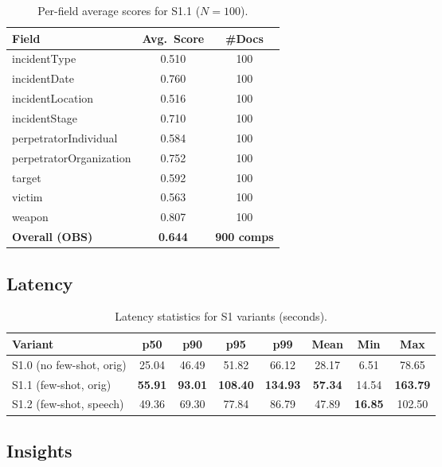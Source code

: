 \begin{table}[H]
    \centering
    \caption{Per-field average scores for S1.1 ($N{=}100$).}
    \label{tab:s1-perfield}
    \begin{tabular}{lcc}
        \toprule
        Field & Avg.\ Score & \#Docs \\
        \midrule
        incidentType & 0.510 & 100 \\
        incidentDate & 0.760 & 100 \\
        incidentLocation & 0.516 & 100 \\
        incidentStage & 0.710 & 100 \\
        perpetratorIndividual & 0.584 & 100 \\
        perpetratorOrganization & 0.752 & 100 \\
        target & 0.592 & 100 \\
        victim & 0.563 & 100 \\
        weapon & 0.807 & 100 \\
        \midrule
        \textbf{Overall (OBS)} & \textbf{0.644} & \textbf{900 comps} \\
        \bottomrule
    \end{tabular}
\end{table}

\subsection*{Latency}

\begin{table}[H]
    \centering
    \caption{Latency statistics for S1 variants (seconds).}
    \label{tab:s1-latency-all}
    \begin{tabular}{lccccccc}
        \toprule
        Variant & p50 & p90 & p95 & p99 & Mean & Min & Max \\
        \midrule
        S1.0 (no few-shot, orig) & 25.04 & 46.49 & 51.82 & 66.12 & 28.17 & 6.51 & 78.65 \\
        S1.1 (few-shot, orig)    & \textbf{55.91} & \textbf{93.01} & \textbf{108.40} & \textbf{134.93} & \textbf{57.34} & 14.54 & \textbf{163.79} \\
        S1.2 (few-shot, speech)  & 49.36 & 69.30 & 77.84 & 86.79 & 47.89 & \textbf{16.85} & 102.50 \\
        \bottomrule
    \end{tabular}
\end{table}

\subsection*{Insights}

